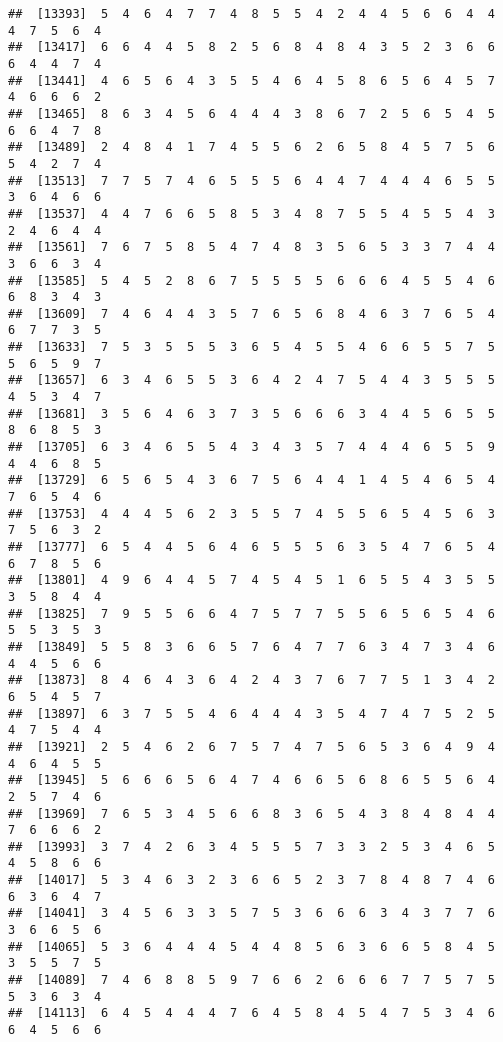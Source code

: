 \documentclass[
]{book}
\begin{document}
\begin{verbatim}
##  [13393]  5  4  6  4  7  7  4  8  5  5  4  2  4  4  5  6  6  4  4  4  7  5  6  4
##  [13417]  6  6  4  4  5  8  2  5  6  8  4  8  4  3  5  2  3  6  6  6  4  4  7  4
##  [13441]  4  6  5  6  4  3  5  5  4  6  4  5  8  6  5  6  4  5  7  4  6  6  6  2
##  [13465]  8  6  3  4  5  6  4  4  4  3  8  6  7  2  5  6  5  4  5  6  6  4  7  8
##  [13489]  2  4  8  4  1  7  4  5  5  6  2  6  5  8  4  5  7  5  6  5  4  2  7  4
##  [13513]  7  7  5  7  4  6  5  5  5  6  4  4  7  4  4  4  6  5  5  3  6  4  6  6
##  [13537]  4  4  7  6  6  5  8  5  3  4  8  7  5  5  4  5  5  4  3  2  4  6  4  4
##  [13561]  7  6  7  5  8  5  4  7  4  8  3  5  6  5  3  3  7  4  4  3  6  6  3  4
##  [13585]  5  4  5  2  8  6  7  5  5  5  5  6  6  6  4  5  5  4  6  6  8  3  4  3
##  [13609]  7  4  6  4  4  3  5  7  6  5  6  8  4  6  3  7  6  5  4  6  7  7  3  5
##  [13633]  7  5  3  5  5  5  3  6  5  4  5  5  4  6  6  5  5  7  5  5  6  5  9  7
##  [13657]  6  3  4  6  5  5  3  6  4  2  4  7  5  4  4  3  5  5  5  4  5  3  4  7
##  [13681]  3  5  6  4  6  3  7  3  5  6  6  6  3  4  4  5  6  5  5  8  6  8  5  3
##  [13705]  6  3  4  6  5  5  4  3  4  3  5  7  4  4  4  6  5  5  9  4  4  6  8  5
##  [13729]  6  5  6  5  4  3  6  7  5  6  4  4  1  4  5  4  6  5  4  7  6  5  4  6
##  [13753]  4  4  4  5  6  2  3  5  5  7  4  5  5  6  5  4  5  6  3  7  5  6  3  2
##  [13777]  6  5  4  4  5  6  4  6  5  5  5  6  3  5  4  7  6  5  4  6  7  8  5  6
##  [13801]  4  9  6  4  4  5  7  4  5  4  5  1  6  5  5  4  3  5  5  3  5  8  4  4
##  [13825]  7  9  5  5  6  6  4  7  5  7  7  5  5  6  5  6  5  4  6  5  5  3  5  3
##  [13849]  5  5  8  3  6  6  5  7  6  4  7  7  6  3  4  7  3  4  6  4  4  5  6  6
##  [13873]  8  4  6  4  3  6  4  2  4  3  7  6  7  7  5  1  3  4  2  6  5  4  5  7
##  [13897]  6  3  7  5  5  4  6  4  4  4  3  5  4  7  4  7  5  2  5  4  7  5  4  4
##  [13921]  2  5  4  6  2  6  7  5  7  4  7  5  6  5  3  6  4  9  4  4  6  4  5  5
##  [13945]  5  6  6  6  5  6  4  7  4  6  6  5  6  8  6  5  5  6  4  2  5  7  4  6
##  [13969]  7  6  5  3  4  5  6  6  8  3  6  5  4  3  8  4  8  4  4  7  6  6  6  2
##  [13993]  3  7  4  2  6  3  4  5  5  5  7  3  3  2  5  3  4  6  5  4  5  8  6  6
##  [14017]  5  3  4  6  3  2  3  6  6  5  2  3  7  8  4  8  7  4  6  6  3  6  4  7
##  [14041]  3  4  5  6  3  3  5  7  5  3  6  6  6  3  4  3  7  7  6  3  6  6  5  6
##  [14065]  5  3  6  4  4  4  5  4  4  8  5  6  3  6  6  5  8  4  5  3  5  5  7  5
##  [14089]  7  4  6  8  8  5  9  7  6  6  2  6  6  6  7  7  5  7  5  5  3  6  3  4
##  [14113]  6  4  5  4  4  4  7  6  4  5  8  4  5  4  7  5  3  4  6  6  4  5  6  6

\end{verbatim}
\end{document}
